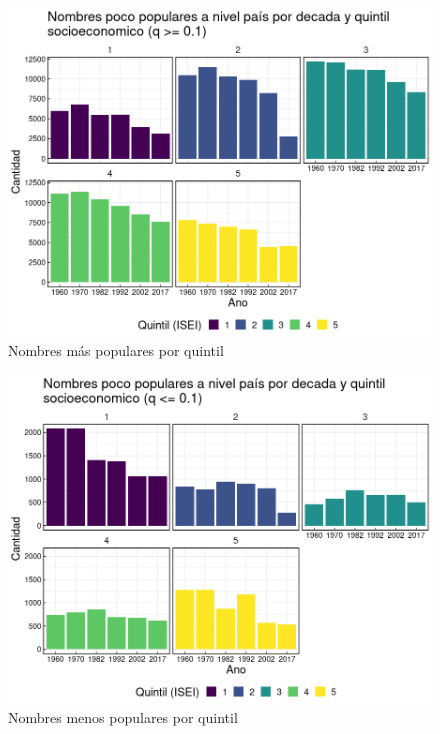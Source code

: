 \begin{landscape}
\begin{figure}[H]
\begin{center}
    \includegraphics[width=20cm]{plot/most_popular_gral.png}
    \caption{Nombres más populares por quintil}
    \label{fig:most_popular_gral}
\end{center}
\end{figure}
\end{landscape}


\begin{landscape}
\begin{figure}[H]
\begin{center}
    \includegraphics[width=20cm]{plot/poco_pop_gral.png}
    \caption{Nombres menos populares por quintil}
    \label{fig:poco_pop_gral}
\end{center}
\end{figure}
\end{landscape}






